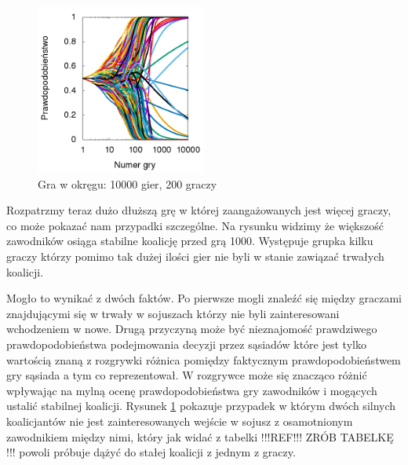 \begin{figure}
    \centering
    \includegraphics[width=0.5\textwidth]{pict/wyniki/g10000p200}   
    \caption{Gra w okręgu: 10000 gier, 200 graczy}
	\label{fig:niechciani} 
\end{figure}

Rozpatrzmy teraz dużo dłuższą grę w której zaangażowanych jest więcej graczy, co może pokazać nam przypadki szczególne. Na rysunku widzimy że większość zawodników osiąga stabilne koalicję przed grą 1000. Występuje grupka kilku graczy którzy pomimo tak dużej ilości gier nie byli w stanie zawiązać trwałych koalicji.

Mogło to wynikać z dwóch faktów. Po pierwsze mogli znaleźć się między graczami znajdującymi się w trwały w sojuszach którzy nie byli zainteresowani wchodzeniem w nowe. Drugą przyczyną może być nieznajomość prawdziwego prawdopodobieństwa podejmowania decyzji przez sąsiadów które jest tylko wartością znaną z rozgrywki różnica pomiędzy faktycznym prawdopodobieństwem gry sąsiada a tym co reprezentował. W rozgrywce może się znacząco różnić wpływając na mylną ocenę prawdopodobieństwa gry zawodników i mogących ustalić stabilnej koalicji. Rysunek \ref{fig:niechciani} pokazuje przypadek w którym dwóch silnych koalicjantów nie jest zainteresowanych wejście w sojusz z osamotnionym zawodnikiem między nimi, który jak widać z tabelki !!!REF!!! ZRÓB TABELKĘ !!! powoli próbuje dążyć do stałej koalicji z jednym z graczy.  

